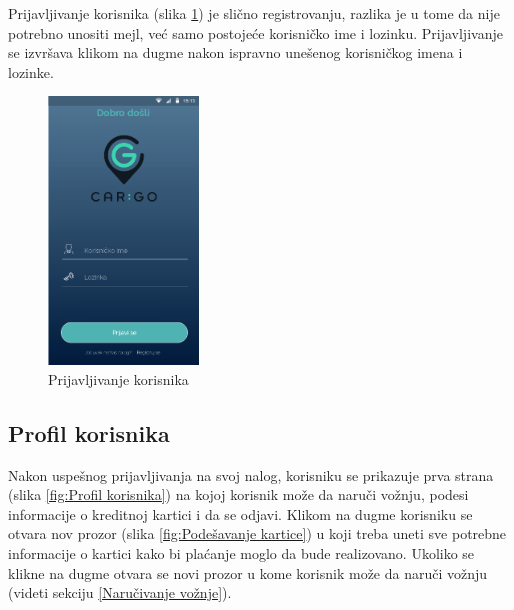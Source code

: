 Prijavljivanje korisnika (slika \ref{fig:Prijavljivanje korisnika}) je slično registrovanju, razlika je u tome da nije potrebno unositi mejl, već samo postojeće korisničko ime i lozinku. Prijavljivanje se izvršava klikom na dugme  nakon ispravno unešenog korisničkog imena i lozinke.
\begin{figure}[H]
\begin{center}
\includegraphics[width=4cm]{Slike/Prijavljivanje.png}
\end{center}
    \caption{Prijavljivanje korisnika}
\label{fig:Prijavljivanje korisnika}
\end{figure}


\subsection{\bfseries Profil korisnika}

Nakon uspešnog prijavljivanja na svoj nalog, korisniku se prikazuje prva strana (slika \ref{fig:Profil korisnika}) na kojoj korisnik može da naruči vožnju, podesi informacije o kreditnoj kartici i da se odjavi. Klikom na dugme  korisniku se otvara nov prozor (slika \ref{fig:Podešavanje kartice}) u koji treba uneti sve potrebne informacije o kartici kako bi plaćanje moglo da bude realizovano. Ukoliko se klikne na dugme  otvara se novi prozor u kome korisnik može da naruči vožnju (videti sekciju \ref{Naručivanje vožnje}).


